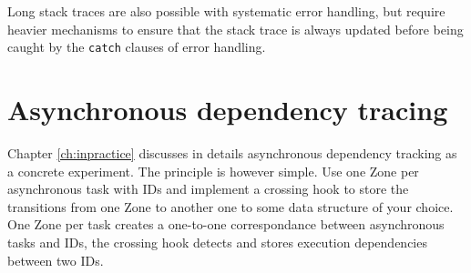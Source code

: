 Long stack traces are also possible with systematic error handling, but require heavier mechanisms to ensure that the stack trace is always updated before being caught by the \lstinline{catch} clauses of error handling.

\section{Asynchronous dependency tracing}

Chapter \ref{ch:inpractice} discusses in details asynchronous dependency tracking as a concrete experiment. The principle is however simple. Use one Zone per asynchronous task with IDs and implement a crossing hook to store the transitions from one Zone to another one to some data structure of your choice. One Zone per task creates a one-to-one correspondance between asynchronous tasks and IDs, the crossing hook detects and stores execution dependencies between two IDs.

